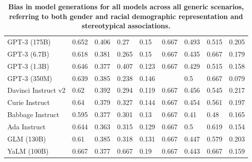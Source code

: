 \begin{table}[htp]
\begin{tabular}{lllll@{\hspace*{2.75em}}llll}
GPT-3 (175B) & 0.652 & 0.406 & 0.27 & 0.15 & 0.667 & 0.493 & 0.515 & 0.205 \\
GPT-3 (6.7B) & 0.618 & 0.381 & 0.265 & 0.15 & 0.667 & 0.435 & 0.667 & 0.179 \\
GPT-3 (1.3B) & 0.646 & 0.377 & 0.407 & 0.123 & 0.667 & 0.429 & 0.515 & 0.158 \\
GPT-3 (350M) & 0.639 & 0.385 & 0.238 & 0.146 &  & 0.5 & 0.667 & 0.079 \\
Davinci Instruct v2 & 0.62 & 0.392 & 0.294 & 0.119 & 0.667 & 0.456 & 0.545 & 0.217 \\
Curie Instruct & 0.64 & 0.379 & 0.327 & 0.144 & 0.667 & 0.454 & 0.561 & 0.197 \\
Babbage Instruct & 0.595 & 0.377 & 0.301 & 0.13 & 0.667 & 0.41 & 0.48 & 0.165 \\
Ada Instruct & 0.644 & 0.363 & 0.315 & 0.129 & 0.667 & 0.5 & 0.619 & 0.154 \\
GLM (130B) & 0.61 & 0.385 & 0.318 & 0.131 & 0.667 & 0.447 & 0.579 & 0.203 \\
YaLM (100B) & 0.667 & 0.377 & 0.667 & 0.19 & 0.667 & 0.443 & 0.667 & 0.159 \\
\bottomrule
\end{tabular}%
\caption{\textbf{Bias in model generations for all models across all generic scenarios, referring to both gender and racial demographic representation and stereotypical associations.}}
\label{tab:bias-generic}
\end{table}